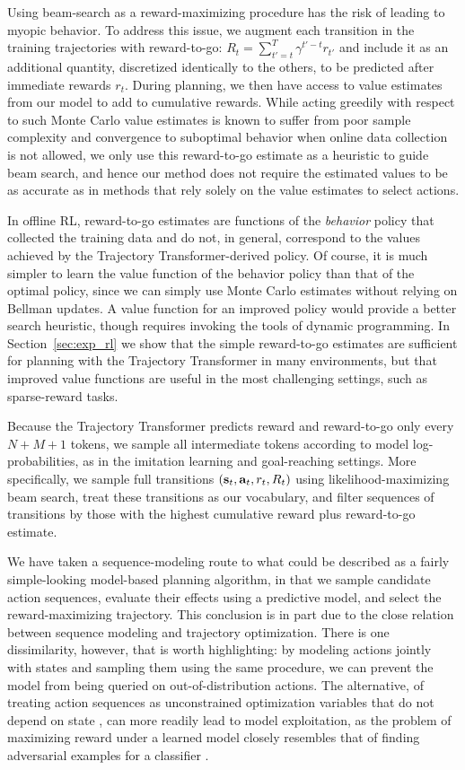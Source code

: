 Using beam-search as a reward-maximizing procedure has the risk of leading to myopic behavior.
To address this issue, we augment each transition in the training trajectories with reward-to-go:
$R_t = \sum_{t'=t}^{T} \gamma^{t'-t} r_{t'}$
and include it as an additional quantity, discretized identically to the others, to be predicted after immediate rewards $r_t$.
During planning, we then have access to value estimates from our model to add to cumulative rewards.
While acting greedily with respect to such Monte Carlo value estimates is known to suffer from poor sample complexity and convergence to suboptimal behavior when online data collection is not allowed, we only use this reward-to-go estimate as a heuristic to guide beam search, and hence our method does not require the estimated values to be as accurate as in methods that rely solely on the value estimates to select actions.

In offline RL, reward-to-go estimates are functions of the \emph{behavior} policy that collected the training data and do not, in general, correspond to the values achieved by the Trajectory Transformer-derived policy.
Of course, it is much simpler to learn the value function of the behavior policy than that of the optimal policy, since we can simply use Monte Carlo estimates without relying on Bellman updates.
A value function for an improved policy would provide a better search heuristic, though requires invoking the tools of dynamic programming.
In Section~\ref{sec:exp_rl} we show that the simple reward-to-go estimates are sufficient for planning with the Trajectory Transformer in many environments, but that improved value functions are useful in the most challenging settings, such as sparse-reward tasks.

Because the Trajectory Transformer predicts reward and reward-to-go only every $N+M+1$ tokens, we sample all intermediate tokens according to model log-probabilities, as in the imitation learning and goal-reaching settings.
More specifically, we sample full transitions $(\mathbf{s}_t, \mathbf{a}_t, r_t, R_t)$ using likelihood-maximizing beam search, treat these transitions as our vocabulary, and filter sequences of transitions by those with the highest cumulative reward plus reward-to-go estimate.

We have taken a sequence-modeling route to what could be described as a fairly simple-looking model-based planning algorithm, in that we sample candidate action sequences, evaluate their effects using a predictive model, and select the reward-maximizing trajectory.
This conclusion is in part due to the close relation between sequence modeling and trajectory optimization.
There is one dissimilarity, however, that is worth highlighting: by modeling actions jointly with states and sampling them using the same procedure, we can prevent the model from being queried on out-of-distribution actions.
The alternative, of treating action sequences as unconstrained optimization variables that do not depend on state \citep{nagabandi2018mbmf}, can more readily lead to model exploitation, as the problem of maximizing reward under a learned model closely resembles that of finding adversarial examples for a classifier \citep{goodfellow2014explaining}.
